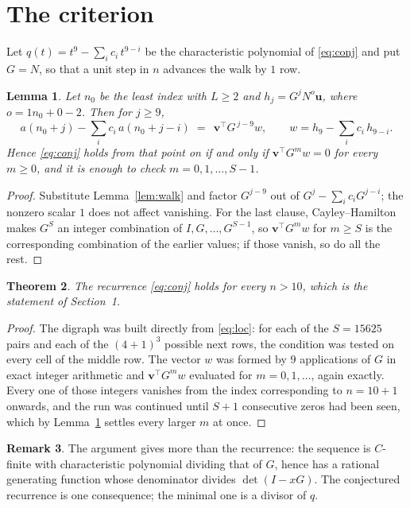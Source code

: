 \documentclass[11pt,a4paper]{article}
\theoremstyle{plain}
\newtheorem{theorem}{Theorem}
\newtheorem{lemma}[theorem]{Lemma}
\theoremstyle{definition}
\newtheorem{remark}[theorem]{Remark}
\begin{document}
\section{The criterion}

Let $q(t)=t^{9}-\sum_i c_i\,t^{9-i}$ be the characteristic polynomial of
\eqref{eq:conj} and put $G=N$, so that a unit step in $n$ advances the walk by
$1$ row.

\begin{lemma}\label{lem:crit}
Let $n_0$ be the least index with $L\ge2$ and $h_j=G^{j}N^{o}\mathbf{u}$, where
$o=1n_0+0-2$. Then for $j\ge9$,
\[
a(n_0+j)-\sum_i c_i\,a(n_0+j-i)\;=\;\,\mathbf{v}^{\!\top}G^{\,j-9}w,
\qquad w=h_{9}-\sum_i c_i\,h_{9-i} .
\]
Hence \eqref{eq:conj} holds from that point on if and only if
$\mathbf{v}^{\!\top}G^{m}w=0$ for every $m\ge0$, and it is enough to check
$m=0,1,\dots,S-1$.
\end{lemma}

\begin{proof}
Substitute Lemma~\ref{lem:walk} and factor $G^{j-9}$ out of
$G^{j}-\sum_ic_iG^{j-i}$; the nonzero scalar $1$ does not affect
vanishing. For the last clause, Cayley--Hamilton makes $G^{S}$ an integer combination of
$I,G,\dots,G^{S-1}$, so $\mathbf{v}^{\!\top}G^{m}w$ for $m\ge S$ is the corresponding
combination of the earlier values; if those vanish, so do all the rest.
\end{proof}

\begin{theorem}
The recurrence \eqref{eq:conj} holds for every $n>10$, which is the statement of
Section~1.
\end{theorem}

\begin{proof}
The digraph was built directly from \eqref{eq:loc}: for each of the $S=15625$ pairs and each
of the $(4+1)^{3}$ possible next rows, the condition was tested on every cell of
the middle row. The vector $w$ was formed by $9$ applications of $G$ in exact integer
arithmetic and $\mathbf{v}^{\!\top}G^{m}w$ evaluated for $m=0,1,\dots$, again exactly.
Every one of those integers vanishes from the index corresponding to $n=10+1$ onwards,
and the run was continued until $S+1$ consecutive zeros had been seen, which by
Lemma~\ref{lem:crit} settles every larger $m$ at once.
\end{proof}

\begin{remark}
The argument gives more than the recurrence: the sequence is $C$-finite with characteristic
polynomial dividing that of $G$, hence has a rational generating function whose denominator
divides $\det(I-xG)$. The conjectured recurrence is one consequence; the minimal one is a
divisor of $q$.
\end{remark}
\end{document}
